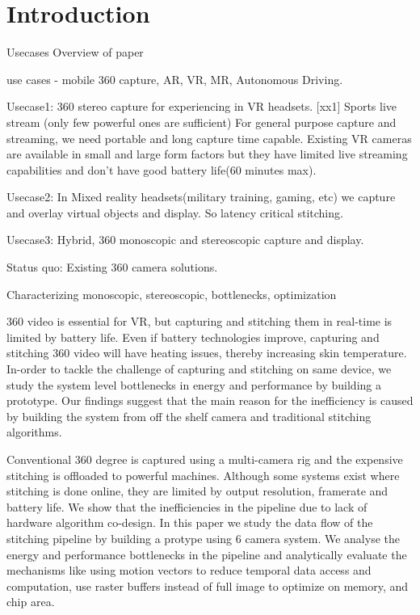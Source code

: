 \chapter{Introduction}
Usecases \newline
Overview of paper \newline

use cases - mobile 360 capture, AR, VR, MR, Autonomous Driving. \newline

Usecase1: 360 stereo capture for experiencing in VR headsets. 
[xx1] Sports live stream (only few powerful ones are sufficient)
For general purpose capture and streaming, we need portable and long capture time capable. Existing VR cameras are available in small and large form factors but they have limited live streaming capabilities and don't have good battery life(60 minutes max). 

Usecase2: In Mixed reality headsets(military training, gaming, etc) we capture and overlay virtual objects and display. So latency critical stitching. 

Usecase3: Hybrid, 360 monoscopic and stereoscopic capture and display.

Status quo:
Existing 360 camera solutions. \newline



Characterizing monoscopic, stereoscopic, bottlenecks, optimization


360 video is essential for VR, but capturing and stitching them in real-time is limited by battery life. Even if battery technologies improve, capturing and stitching 360 video will have heating issues, thereby increasing skin temperature. In-order to tackle the challenge of capturing and stitching on same device, we study the system level bottlenecks in energy and performance by building a prototype. Our findings suggest that the main reason for the inefficiency is caused by building the system from off the shelf camera and traditional stitching algorithms. 

Conventional 360 degree is captured using a multi-camera rig and the expensive stitching is offloaded to powerful machines. Although some systems exist where stitching is done online, they are limited by output resolution, framerate and battery life. We show that the inefficiencies in the pipeline due to lack of hardware algorithm co-design. In this paper we study the data flow of the stitching pipeline by building a protype using 6 camera system. We analyse the energy and performance bottlenecks in the pipeline and analytically evaluate the mechanisms like using motion vectors to reduce temporal data access and computation, use raster buffers instead of full image to optimize on memory, and chip area. 


